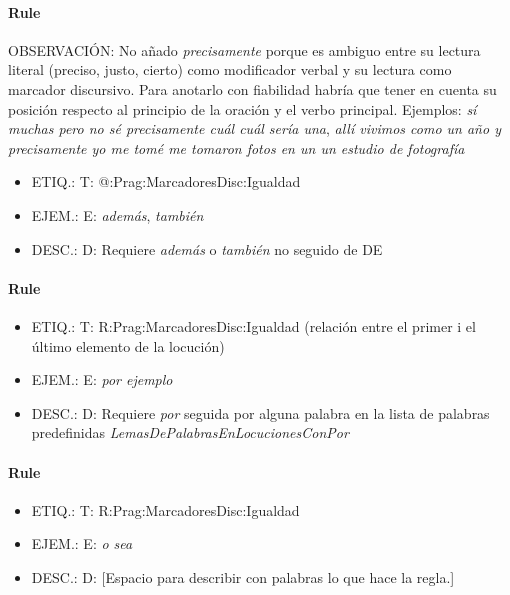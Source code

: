 \documentclass[11pt]{report}
\begin{document}
\paragraph*{Rule}
OBSERVACIÓN: No añado \emph{precisamente} porque es ambiguo entre su lectura literal (preciso, justo, cierto) como modificador verbal y su lectura como marcador discursivo. Para anotarlo con fiabilidad habría que tener en cuenta su posición respecto al principio de la oración y el verbo principal. Ejemplos: \emph{sí muchas pero no sé precisamente cuál cuál sería una}, \emph{allí vivimos como un año y precisamente yo me tomé me tomaron fotos en un un estudio de fotografía}

\begin{itemize}
\item ETIQ.:  T: @:Prag:MarcadoresDisc:Igualdad
\item EJEM.:  E: \emph{además}, \emph{también}
\item DESC.:  D: Requiere \emph{además} o \emph{también} no seguido de DE
\end{itemize}

\paragraph*{Rule}
\begin{itemize}
\item ETIQ.:  T: R:Prag:MarcadoresDisc:Igualdad (relación entre el primer i el último elemento de la locución)
\item EJEM.:  E: \emph{por ejemplo}
\item DESC.:  D: Requiere \emph{por} seguida por alguna palabra en la lista de palabras predefinidas \emph{LemasDePalabrasEnLocucionesConPor}
\end{itemize}

\paragraph*{Rule}
\begin{itemize}
\item ETIQ.:  T: R:Prag:MarcadoresDisc:Igualdad
\item EJEM.:  E: \emph{o sea}
\item DESC.:  D: [Espacio para describir con palabras lo que hace la regla.]
\end{itemize}
\end{document}
